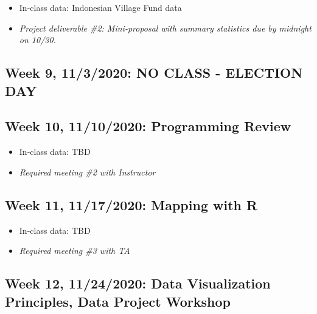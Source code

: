 \documentclass[11pt,]{article}
\providecommand{\tightlist}{%
  \setlength{\itemsep}{0pt}\setlength{\parskip}{0pt}}
\begin{document}
\begin{itemize}
\tightlist
\item
  In-class data: Indonesian Village Fund data
\item
  \emph{Project deliverable \#2: Mini-proposal with summary statistics
  due by midnight on 10/30.} \medskip
\end{itemize}

\hypertarget{week-9-1132020-no-class---election-day}{%
\subsection{Week 9, 11/3/2020: NO CLASS - ELECTION
DAY}\label{week-9-1132020-no-class---election-day}}

\medskip

\hypertarget{week-10-11102020-programming-review}{%
\subsection{Week 10, 11/10/2020: Programming
Review}\label{week-10-11102020-programming-review}}

\begin{itemize}
\tightlist
\item
  In-class data: TBD
\item
  \emph{Required meeting \#2 with Instructor} \medskip
\end{itemize}

\hypertarget{week-11-11172020-mapping-with-r}{%
\subsection{Week 11, 11/17/2020: Mapping with
R}\label{week-11-11172020-mapping-with-r}}

\begin{itemize}
\tightlist
\item
  In-class data: TBD
\item
  \emph{Required meeting \#3 with TA} \medskip
\end{itemize}

\hypertarget{week-12-11242020-data-visualization-principles-data-project-workshop}{%
\subsection{Week 12, 11/24/2020: Data Visualization Principles, Data
Project
Workshop}\label{week-12-11242020-data-visualization-principles-data-project-workshop}}
\end{document}
